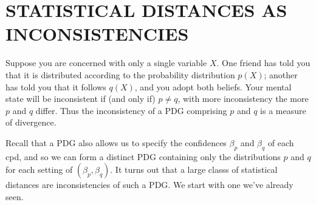 \documentclass[twoside]{article}
\theoremstyle{plain}
\theoremstyle{definition}
\begin{document}


\section{STATISTICAL DISTANCES AS INCONSISTENCIES} \label{sec:statdist}
Suppose you are concerned with only a single variable $X$. One friend has told you that it is distributed according to the probability distribution $p(X)$; another has told you that it follows $q(X)$, and you adopt both beliefs. Your mental state will be inconsistent if (and only if) $p \ne q$, with more inconsistency the more $p$ and $q$ differ.
Thus the inconsistency of a PDG comprising $p$ and $q$ is a measure of divergence.

Recall that a PDG also allows us to specify the confidences $\beta_p$ and $\beta_q$ of each cpd, and so we can form a distinct PDG containing only the distributions $p$ and $q$ for each setting of $(\beta_p, \beta_q)$.
It turns out that a large classs of statistical distances are inconsistencies of such a PDG.
We start with one we've already seen.
\end{document}
